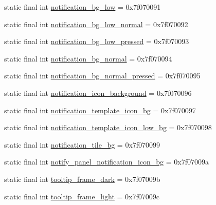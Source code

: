 \begin{DoxyCompactItemize}
\item 
static final int \mbox{\hyperlink{classandroid_1_1support_1_1v7_1_1appcompat_1_1R_1_1drawable_a353cdafefc3107597d0db87596e73921}{notification\+\_\+bg\+\_\+low}} = 0x7f070091
\item 
static final int \mbox{\hyperlink{classandroid_1_1support_1_1v7_1_1appcompat_1_1R_1_1drawable_a79aab8d64db424afe8354efa6ef5c26a}{notification\+\_\+bg\+\_\+low\+\_\+normal}} = 0x7f070092
\item 
static final int \mbox{\hyperlink{classandroid_1_1support_1_1v7_1_1appcompat_1_1R_1_1drawable_a914244aa736aa82551d943d49ecb231f}{notification\+\_\+bg\+\_\+low\+\_\+pressed}} = 0x7f070093
\item 
static final int \mbox{\hyperlink{classandroid_1_1support_1_1v7_1_1appcompat_1_1R_1_1drawable_aca8ae4ace4f935b5e62999e5db787423}{notification\+\_\+bg\+\_\+normal}} = 0x7f070094
\item 
static final int \mbox{\hyperlink{classandroid_1_1support_1_1v7_1_1appcompat_1_1R_1_1drawable_ae4a93571a6bb07a75968c7a614532460}{notification\+\_\+bg\+\_\+normal\+\_\+pressed}} = 0x7f070095
\item 
static final int \mbox{\hyperlink{classandroid_1_1support_1_1v7_1_1appcompat_1_1R_1_1drawable_ac0ba483c1471e616dfdfc59676d504b7}{notification\+\_\+icon\+\_\+background}} = 0x7f070096
\item 
static final int \mbox{\hyperlink{classandroid_1_1support_1_1v7_1_1appcompat_1_1R_1_1drawable_a418857631140eaea9a0ba11fa60ab72e}{notification\+\_\+template\+\_\+icon\+\_\+bg}} = 0x7f070097
\item 
static final int \mbox{\hyperlink{classandroid_1_1support_1_1v7_1_1appcompat_1_1R_1_1drawable_a3854c021d5f0768bf8781b5e424e78e4}{notification\+\_\+template\+\_\+icon\+\_\+low\+\_\+bg}} = 0x7f070098
\item 
static final int \mbox{\hyperlink{classandroid_1_1support_1_1v7_1_1appcompat_1_1R_1_1drawable_a27e0dd01a8a504f46a6d181b3a3d8eb4}{notification\+\_\+tile\+\_\+bg}} = 0x7f070099
\item 
static final int \mbox{\hyperlink{classandroid_1_1support_1_1v7_1_1appcompat_1_1R_1_1drawable_ad5705d42ed3ba126974cc60a647f361c}{notify\+\_\+panel\+\_\+notification\+\_\+icon\+\_\+bg}} = 0x7f07009a
\item 
static final int \mbox{\hyperlink{classandroid_1_1support_1_1v7_1_1appcompat_1_1R_1_1drawable_a5e1e725970e14ba17cf3ba19a4fccdc9}{tooltip\+\_\+frame\+\_\+dark}} = 0x7f07009b
\item 
static final int \mbox{\hyperlink{classandroid_1_1support_1_1v7_1_1appcompat_1_1R_1_1drawable_a0f8038bc0517156c3d94469744a30f8a}{tooltip\+\_\+frame\+\_\+light}} = 0x7f07009c
\end{DoxyCompactItemize}


